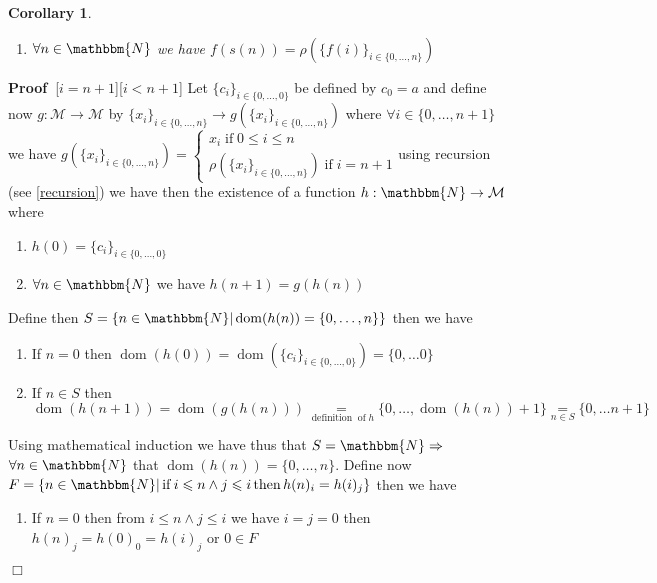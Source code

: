 \documentclass{book}
\newcommand{\equallim}{\mathop{=}\limits}
\newcommand{\tmop}[1]{\ensuremath{\operatorname{#1}}}
\newenvironment{proof}{\noindent\textbf{Proof\ }}{\hspace*{\fill}$\Box$\medskip}
\newtheorem{corollary}{Corollary}
\begin{document}
{{\begin{corollary}
\begin{enumerate}
    \item $\forall n \in \mathbbm{N}$ we have $f (s (n)) = \rho (\{ f (i)
    \}_{i \in \{ 0, \ldots, n \}})$
  \end{enumerate}
\end{corollary}

\begin{proof}[$i = n + 1$][$i < n + 1$]
  Let $\{ c_i \}_{i \in \{ 0, \ldots, 0 \}}$ be defined by $c_0 = a$ and
  define now $g : \mathcal{M} \rightarrow \mathcal{M}$ by $\{ x_i \}_{i \in \{
  0, \ldots, n \}} \rightarrow g (\{ x_i \}_{i \in \{ 0, \ldots, n \}})$ where
  $\forall i \in \{ 0, \ldots, n + 1 \}$ we have $g (\{ x_i \}_{i \in \{ 0,
  \ldots, n \}}) = \left\{ \begin{array}{l}
    x_i \tmop{if} 0 \leqslant i \leqslant n\\
    \rho (\{ x_i \}_{i \in \{ 0, \ldots, n \}}) \tmop{if} i = n + 1
  \end{array} \right.$using recursion (see \ref{recursion}) we have then the
  existence of a function $h : \mathbbm{N} \rightarrow \mathcal{M}$ where
  \begin{enumerate}
    \item $h (0) = \{ c_i \}_{i \in \{ 0, \ldots, 0 \}}$
    
    \item $\forall n \in \mathbbm{N}$ we have $h (n + 1) = g (h (n))$
  \end{enumerate}
  Define then $S = \{ n \in \mathbbm{N}| \tmop{dom} (h (n)) = \{ 0, \ldots, n
  \} \}$ then we have
  \begin{enumerate}
    \item If $n = 0$ then $\tmop{dom} (h (0)) = \tmop{dom} (\{ c_i \}_{i \in
    \{ 0, \ldots, 0 \}}) = \{ 0, \ldots 0 \}$
    
    \item If $n \in S$ then $\tmop{dom} (h (n + 1)) = \tmop{dom} (g (h (n)))
    \equallim_{\tmop{definition} \tmop{of} h} \{ 0, \ldots, \tmop{dom} (h (n))
    + 1 \} \equallim_{n \in S} \{ 0, \ldots n + 1 \}$
  \end{enumerate}
  Using mathematical induction we have thus that $S =\mathbbm{N} \Rightarrow$
  $\forall n \in \mathbbm{N}$ that $\tmop{dom} (h (n)) = \{ 0, \ldots, n \}$.
  Define now $F = \{ n \in \mathbbm{N}| \tmop{if} i \leqslant n \wedge j
  \leqslant i \tmop{then} h (n)_i = h (i)_j \}$ then we have
  \begin{enumerate}
    \item If $n = 0$ then from $i \leqslant n \wedge j \leqslant i$ we have $i
    = j = 0$ then $h (n)_j = h (0)_0 = h (i)_j$ or $0 \in F$
    

\end{enumerate}
\end{proof}}}
\end{document}
